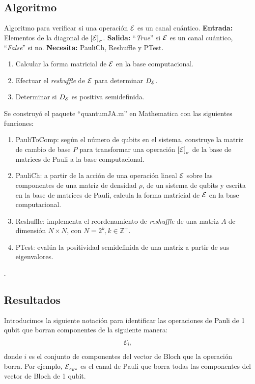 \subsection{Algoritmo}

Algoritmo para verificar si una operación $\mathcal{E}$ es un canal cuántico.
\textbf{Entrada:} Elementos de la diagonal de $\qty[\mathcal{E}]_{\sigma}$. 
\textbf{Salida:} ``\textit{True}'' si $\mathcal{E}$ es un canal cuántico, 
``\textit{False}'' si no.
\textbf{Necesita:} PauliCh, Reshuffle y PTest.
\begin{enumerate}
\item Calcular la forma matricial de $\mathcal{E}$ en la base computacional.
\item Efectuar el \textit{reshuffle} de $\mathcal{E}$ para determinar $D_{\mathcal{E}}$.
\item Determinar si $D_{\mathcal{E}}$ es positiva semidefinida.
\end{enumerate}

Se construyó el paquete ``quantumJA.m'' en Mathematica 
con las siguientes funciones:
\begin{enumerate}
\item PauliToComp: según el número de qubits en el sistema,
construye la matriz de cambio de base $P$
para transformar una operación $\qty[\mathcal{E}]_{\sigma}$ 
de la base de matrices de Pauli a la base computacional.
\item PauliCh: a partir de la acción de una operación lineal $\mathcal{E}$ 
sobre las componentes de una matriz de densidad $\rho$, 
de un sistema de qubits y
escrita en la base de matrices de Pauli,
calcula la forma matricial de $\mathcal{E}$ en la base computacional.
\item Reshuffle: implementa el reordenamiento de 
\textit{reshuffle} de una matriz $A$ de dimensión $N\times N$,
con $N=2^k, k\in \mathbb{Z}^+$.
\item PTest: evalúa la positividad semidefinida de una matriz a partir
de sus eigenvalores.
\end{enumerate}.

\subsection{Resultados}
Introducimos la siguiente notación para identificar las operaciones de Pauli
de 1 qubit que borran componentes de la siguiente manera:
\begin{align*}
\mathcal{E}_{i},
\end{align*}
donde $i$ es el conjunto de componentes del vector de Bloch
que la operación borra. Por ejemplo, $\mathcal{E}_{xyz}$ es el canal de 
Pauli que borra todas las componentes del vector de Bloch 
de 1 qubit.

